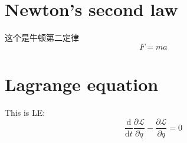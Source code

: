 \documentclass{article}
\begin{document}
\section{Newton's second law}
这个是牛顿第二定律
    $$
    F=ma
    $$

\section{Lagrange equation}
This is LE:
$$
\dfrac{\mathrm{d}}{\mathrm{d}t}\dfrac{\partial\mathcal{L}}{\partial\dot{q}}-\dfrac{\partial\mathcal{L}}{\partial q}=0
$$
\end{document}
